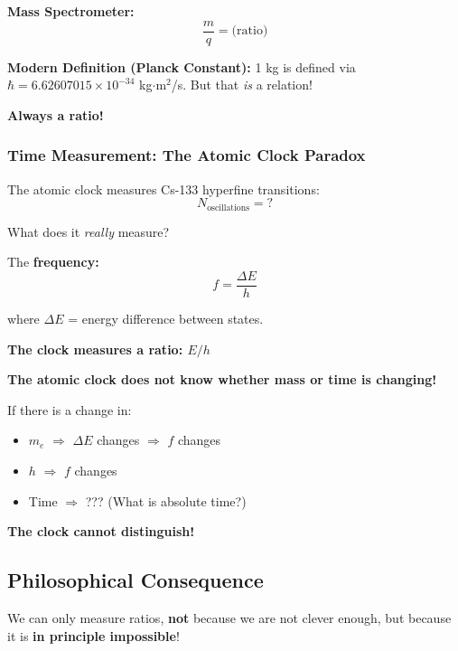 \textbf{Mass Spectrometer:}
\begin{equation}
	\frac{m}{q} = \text{(ratio)}
\end{equation}

\textbf{Modern Definition (Planck Constant):}
1 kg is defined via $\hbar = 6.62607015 \times 10^{-34}$ kg$\cdot$m$^2$/s. But that \textit{is} a relation!

\textbf{Always a ratio!}

\subsubsection{Time Measurement: The Atomic Clock Paradox}

The atomic clock measures Cs-133 hyperfine transitions:
\begin{equation}
	N_\text{oscillations} = ?
\end{equation}

What does it \textit{really} measure?

The \textbf{frequency:}
\begin{equation}
	f = \frac{\Delta E}{h}
\end{equation}

where $\Delta E$ = energy difference between states.

\textbf{The clock measures a ratio: $E/h$}

\begin{critical}
	\textbf{The atomic clock does not know whether mass or time is changing!}
	
	If there is a change in:
	\begin{itemize}[nosep]
		\item $m_e$ $\Rightarrow$ $\Delta E$ changes $\Rightarrow$ $f$ changes
		\item $h$ $\Rightarrow$ $f$ changes
		\item Time $\Rightarrow$ ??? (What is absolute time?)
	\end{itemize}
	
	\textbf{The clock cannot distinguish!}
\end{critical}

\subsection{Philosophical Consequence}

We can only measure ratios, \textbf{not} because we are not clever enough, but because it is \textbf{in principle impossible}!

